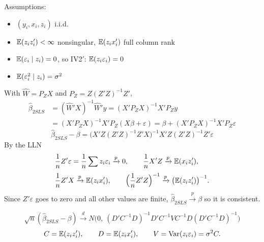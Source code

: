 \documentclass[11pt]{article}
\begin{document}



Assumptions:
\begin{itemize}[nosep]
\item[IV0] $(y_i,x_i,z_i)$ i.i.d.
\item[IV1] $\mathbb{E}(z_iz_i')<\infty$ nonsingular, $\mathbb{E}(z_ix_i')$ full column rank
\item[IV2] $\mathbb{E}(\varepsilon_i\mid z_i)=0$, so IV2$'$: $\mathbb{E}(z_i\varepsilon_i)=0$
\item[IV3] $\mathbb{E}(\varepsilon_i^2\mid z_i)=\sigma^2$
\end{itemize}
With $\hat W=P_ZX$ and $P_Z=Z(Z'Z)^{-1}Z'$,
\[
\begin{aligned}
\hat\beta_{2SLS}&=(\hat W'X)^{-1}\hat W'y=(X'P_ZX)^{-1}X'P_Zy\\
&=(X'P_ZX)^{-1}X'P_Z(X\beta+\varepsilon)=\beta+(X'P_ZX)^{-1}X'P_Z\varepsilon
\end{aligned}
\]
\[
\hat\beta_{2SLS}-\beta=\big(X'Z(Z'Z)^{-1}Z'X\big)^{-1}X'Z(Z'Z)^{-1}Z'\varepsilon
\]
By the LLN
\[
\begin{aligned}
&\frac1nZ'\varepsilon=\frac1n\sum z_i\varepsilon_i\xrightarrow{p}0,\qquad
\frac1nX'Z\xrightarrow{p}\mathbb{E}(x_iz_i'),\\[1mm]
&\frac1nZ'X\xrightarrow{p}\mathbb{E}(z_ix_i'),\qquad
\Big(\frac1nZ'Z\Big)^{-1}\xrightarrow{p}\big(\mathbb{E}(z_iz_i')\big)^{-1}.
\end{aligned}
\]
Since $Z'\varepsilon$ goes to zero and all other values are finite, $\hat\beta_{2SLS}\xrightarrow{p}\beta$ so it is consistent.

\[
\sqrt n(\hat\beta_{2SLS}-\beta)\xrightarrow{d}N\!\Big(0,\ (D'C^{-1}D)^{-1}D'C^{-1}VC^{-1}D(D'C^{-1}D)^{-1}\Big)
\]
\[
C=\mathbb{E}(z_iz_i'),\qquad D=\mathbb{E}(z_ix_i'),\qquad V=\operatorname{Var}(z_i\varepsilon_i)=\sigma^2C .
\]
\end{document}
